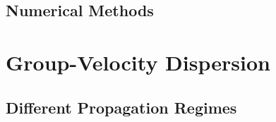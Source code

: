 \documentclass[12pt]{extarticle}
\numberwithin{equation}{section}
\numberwithin{figure}{section}
\numberwithin{table}{section}
\newcommand{\<}{\langle}
\renewcommand{\>}{\rangle}
\theoremstyle{definition}
\begin{document}
    \subsection{Numerical Methods}
            
\newpage
\section{Group-Velocity Dispersion}

\subsection{Different Propagation Regimes}














\end{document}
